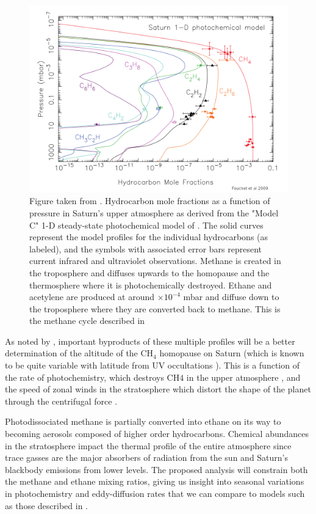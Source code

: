 \documentclass[twocolumn, twocolappendix, numberedappendix, linenumbers]{aastex631}
\newcommand{\tdex}[1]{$\times 10^{#1}$}  %
\begin{document}
\begin{figure}[ht]
\centering
\includegraphics[width=\textwidth]{figs/Fouchet09.png}

\caption{
\footnotesize
Figure taken from \cite{Fouchet09}. Hydrocarbon mole fractions as a function of
pressure in Saturn's upper atmosphere as derived from the "Model C" 1-D
steady-state photochemical model of \cite{Moses05}. The solid curves represent
the model profiles for the individual hydrocarbons (as labeled), and the
symbols with associated error bars represent current infrared and ultraviolet
observations. Methane is created in the troposphere and diffuses upwards to the
homopause and the thermosphere where it is photochemically destroyed. Ethane
and acetylene are produced at around \tdex{-4} mbar and diffuse down to the
troposphere where they are converted back to methane. This is the methane cycle
described in \cite{Strobel69}
}

\label{fig:FouchetPlot}
\end{figure}

As noted by \cite{Fouchet09}, important byproducts of these multiple profiles
will be a better determination of the altitude of the CH$_4$ homopause on
Saturn (which is known to be quite variable with latitude from UV occultations
\citealp{Koskinen13, Koskinen15}). This is a function of the rate of
photochemistry, which destroys CH$4$ in the upper atmosphere \citep{Fouchet09},
and the speed of zonal winds in the stratosphere which distort the shape of the
planet through the centrifugal force \citep{Merritt19}. 

Photodissociated methane is partially converted into ethane on its way to
becoming aerosols composed of higher order hydrocarbons. Chemical abundances in
the stratosphere impact the thermal profile of the entire atmosphere since
trace gasses are the major absorbers of radiation from the sun and Saturn's
blackbody emissions from lower levels. The proposed analysis will constrain
both the methane and ethane mixing ratios, giving us insight into seasonal
variations in photochemistry and eddy-diffusion rates that we can compare to
models such as those described in \cite{Moses05}.
\end{document}
